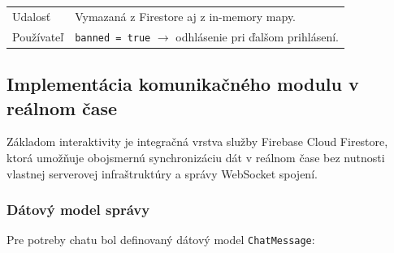 \begin{table}[h]
\begin{tabular}{lp{8.5cm}}
          Udalosť &                                                                                                                                                                                                                
              Vymazaná z Firestore aj z in-memory mapy. \\                                                                                                                                                                         
          Používateľ &                                                                                                                                                                                                             
              \texttt{banned = true} $\rightarrow$ odhlásenie
              pri ďalšom prihlásení. \\                                                                                                                                                                                            
          \bottomrule                                                                                                                                                                                                              
      \end{tabular}
  \end{table}

  \subsection{Implementácia komunikačného modulu v reálnom čase}

  Základom interaktivity je integračná vrstva služby Firebase Cloud
  Firestore, ktorá umožňuje obojsmernú synchronizáciu dát v reálnom čase
  bez nutnosti vlastnej serverovej infraštruktúry a správy WebSocket spojení.

  \iffalse                                                                                                                                                                                                                         
  \subsubsection{Dátový model správy}
  Pre potreby chatu bol definovaný dátový model \texttt{ChatMessage}:

